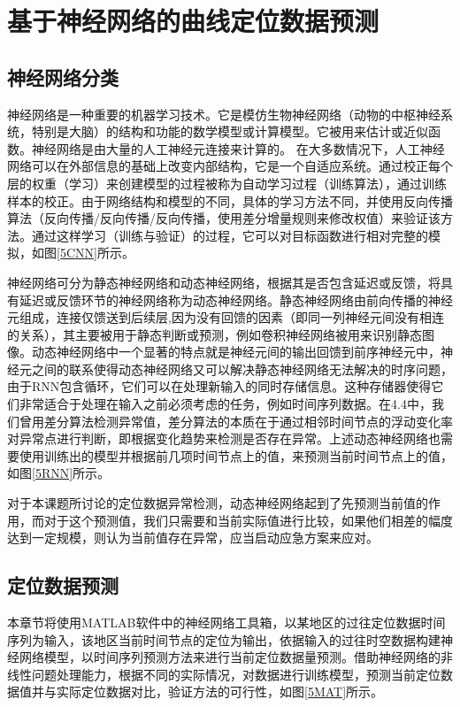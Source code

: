 \documentclass[a4paper,AutoFakeBold,oneside,12pt]{book}
\begin{document}
\section{基于神经网络的曲线定位数据预测}
\subsection{神经网络分类}
	神经网络是一种重要的机器学习技术。它是模仿生物神经网络（动物的中枢神经系统，特别是大脑）的结构和功能的数学模型或计算模型。它被用来估计或近似函数。神经网络是由大量的人工神经元连接来计算的。
	在大多数情况下，人工神经网络可以在外部信息的基础上改变内部结构，它是一个自适应系统。通过校正每个层的权重（学习）来创建模型的过程被称为自动学习过程（训练算法），通过训练样本的校正。由于网络结构和模型的不同，具体的学习方法不同，并使用反向传播算法（反向传播/反向传播/反向传播，使用差分增量规则来修改权值）来验证该方法。通过这样学习（训练与验证）的过程，它可以对目标函数进行相对完整的模拟，如图\ref{5CNN}所示。


	神经网络可分为静态神经网络和动态神经网络，根据其是否包含延迟或反馈，将具有延迟或反馈环节的神经网络称为动态神经网络。静态神经网络由前向传播的神经元组成，连接仅馈送到后续层,因为没有回馈的因素（即同一列神经元间没有相连的关系），其主要被用于静态判断或预测，例如卷积神经网络被用来识别静态图像。动态神经网络中一个显著的特点就是神经元间的输出回馈到前序神经元中，神经元之间的联系使得动态神经网络又可以解决静态神经网络无法解决的时序问题，由于RNN包含循环，它们可以在处理新输入的同时存储信息。这种存储器使得它们非常适合于处理在输入之前必须考虑的任务，例如时间序列数据。在4.4中，我们曾用差分算法检测异常值，差分算法的本质在于通过相邻时间节点的浮动变化率对异常点进行判断，即根据变化趋势来检测是否存在异常。上述动态神经网络也需要使用训练出的模型并根据前几项时间节点上的值，来预测当前时间节点上的值，如图\ref{5RNN}所示。


	对于本课题所讨论的定位数据异常检测，动态神经网络起到了先预测当前值的作用，而对于这个预测值，我们只需要和当前实际值进行比较，如果他们相差的幅度达到一定规模，则认为当前值存在异常，应当启动应急方案来应对。

\subsection{定位数据预测}
	本章节将使用MATLAB软件中的神经网络工具箱，以某地区的过往定位数据时间序列为输入，该地区当前时间节点的定位为输出，依据输入的过往时空数据构建神经网络模型，以时间序列预测方法来进行当前定位数据量预测。借助神经网络的非线性问题处理能力，根据不同的实际情况，对数据进行训练模型，预测当前定位数据值并与实际定位数据对比，验证方法的可行性，如图\ref{5MAT}所示。
\end{document}
